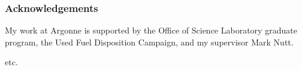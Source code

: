 
\begin{frame}[ctb!]
  \frametitle{Acknowledgements}  
  My work at Argonne is supported by the Office of Science Laboratory graduate 
  program, the Used Fuel Disposition Campaign, and my supervisor Mark Nutt.

   etc.
\end{frame}
